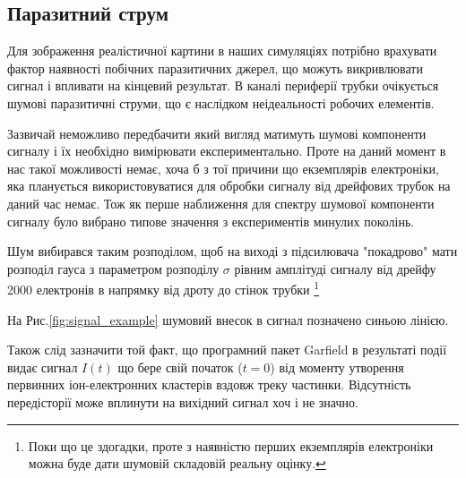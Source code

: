 \documentclass[pdftex,14pt]{scrartcl}
\begin{document}
\begin{spacing}{1.5}
			
	
	\subsection{Паразитний струм}
	
	Для зображення реалістичної картини в наших симуляціях потрібно врахувати фактор наявності побічних паразитичних джерел, що можуть викривлювати сигнал і впливати на кінцевий результат.
	В каналі периферії трубки очікується шумові паразитичні струми, що є наслідком неідеальності робочих елементів. 
	
	Зазвичай неможливо передбачити який вигляд матимуть шумові компоненти сигналу і їх необхідно вимірювати експериментально. Проте на даний момент в нас такої можливості немає, хоча б з тої причини що екземплярів електроніки, яка планується використовуватися для обробки сигналу від дрейфових трубок на даний час немає. Тож як перше наближення для спектру шумової компоненти сигналу було вибрано типове значення з експериментів минулих поколінь.
	
	Шум вибирався таким розподілом, щоб на виході з підсилювача "покадрово" мати розподіл гауса з параметром розподілу $\sigma$ рівним амплітуді сигналу від дрейфу 2000 електронів в напрямку від дроту до стінок трубки \footnote{ Поки що це здогадки, проте з наявністю перших екземплярів електроніки можна буде дати шумовій складовій реальну оцінку.}
	
	На Рис.\ref{fig:signal_example} шумовий внесок в сигнал позначено синьою лінією.
	
	Також слід зазначити той факт, що програмний пакет Garfield в результаті події видає сигнал $I(t)$ що бере свій початок ($t=0$) від моменту утворення первинних іон-електронних кластерів вздовж треку частинки. Відсутність передісторії може вплинути на вихідний сигнал хоч і не значно.
		
	
		

\end{spacing}
\end{document}
